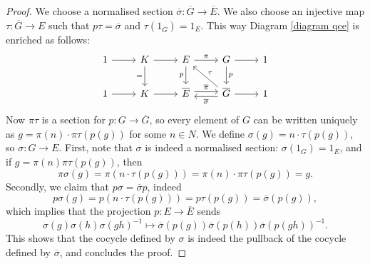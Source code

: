 \documentclass[10pt,a4paper]{amsart}
\begin{document}
\begin{proof}
    We choose a normalised section $\overline \sigma \colon \overline G \to \overline E$. We also choose an injective map $\tau \colon \overline G \to E$ such that $p \tau = \overline \sigma$ and $\tau(1_{\overline{G}}) = 1_E$. This way Diagram \eqref{diagram qce} is enriched as follows:
\[\begin{tikzcd}
	1 & K & E & G & 1 \\
	1 & K & {\overline{E}} & {\overline{G}} & 1
	\arrow[from=1-1, to=1-2]
	\arrow[from=1-2, to=1-3]
	\arrow["{=}"', from=1-2, to=2-2]
	\arrow["\pi", from=1-3, to=1-4]
	\arrow["p"', from=1-3, to=2-3]
	\arrow[from=1-4, to=1-5]
	\arrow["p", from=1-4, to=2-4]
	\arrow[from=2-1, to=2-2]
	\arrow[from=2-2, to=2-3]
	\arrow["{\overline \pi}", shift left, from=2-3, to=2-4]
	\arrow["\tau"', from=2-4, to=1-3]
	\arrow["{\overline\sigma}", shift left, from=2-4, to=2-3]
	\arrow[from=2-4, to=2-5]
\end{tikzcd}\]
    Now $\pi \tau$ is a section for $p \colon G \to \overline G$, so every element of $G$ can be written uniquely as $g = \pi(n) \cdot \pi \tau(p(g))$ for some $n\in N$. We define $\sigma(g) = n \cdot \tau(p(g))$, so $\sigma \colon G \to E$.
    First, note that $\sigma$ is indeed a normalised section: $\sigma(1_G) = 1_E$, and if $g = \pi(n) \pi \tau (p(g))$, then
    \[\pi\sigma(g) = \pi(n \cdot \tau(p(g))) = \pi(n) \cdot \pi \tau(p(g)) = g.\]
    Secondly, we claim that $p \sigma = \overline \sigma p$, indeed
    \[p\sigma(g) = p(n \cdot \tau(p(g))) = p\tau(p(g)) = \overline \sigma(p(g)),\]
    which implies that the projection $p \colon E \to \overline E$ sends
    \[\sigma(g)\sigma(h)\sigma(gh)^{-1} \mapsto \overline \sigma(p(g)) \overline \sigma(p(h)) \overline \sigma(p(gh))^{-1}.\]
    This shows that the cocycle defined by $\sigma$ is indeed the pullback of the cocycle defined by $\overline \sigma$, and concludes the proof.
\end{proof}
\end{document}
